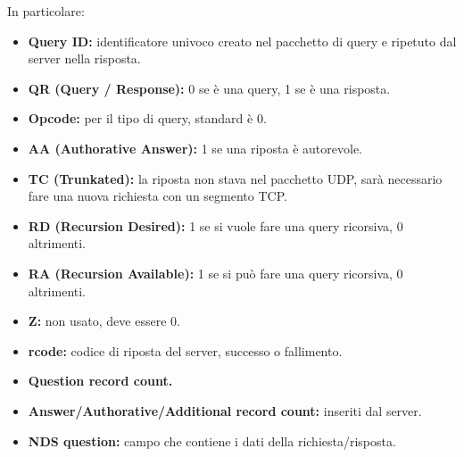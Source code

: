In particolare:
\begin{itemize}
    \item \textbf{Query ID:} identificatore univoco creato nel pacchetto di query e ripetuto dal server nella risposta.
    \item \textbf{QR (Query / Response):} 0 se è una query, 1 se è una risposta.
    \item \textbf{Opcode:} per il tipo di query, standard è 0.
    \item \textbf{AA (Authorative Answer):} 1 se una riposta è autorevole.
    \item \textbf{TC (Trunkated):} la riposta non stava nel pacchetto UDP, sarà necessario fare una nuova richiesta con un segmento TCP.
    \item \textbf{RD (Recursion Desired):} 1 se si vuole fare una query ricorsiva, 0 altrimenti.
    \item \textbf{RA (Recursion Available):} 1 se si può fare una query ricorsiva, 0 altrimenti.
    \item \textbf{Z:} non usato, deve essere 0.
    \item \textbf{rcode:} codice di riposta del server, successo o fallimento.
    \item \textbf{Question record count.} 
    \item \textbf{Answer/Authorative/Additional record count:} inseriti dal server.
    \item \textbf{NDS question:} campo che contiene i dati della richiesta/risposta.
\end{itemize}
